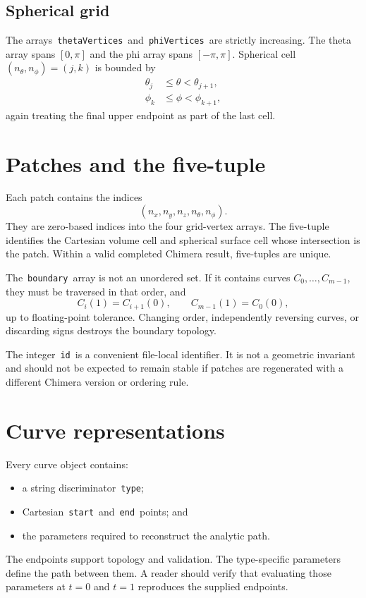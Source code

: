 \documentclass[11pt]{article}
\newcommand{\field}[1]{\texttt{#1}}
\begin{document}
\subsection{Spherical grid}

The arrays \,\field{thetaVertices}\, and \,\field{phiVertices}\, are strictly
increasing.  The theta array spans $[0,\pi]$ and the phi array spans
$[-\pi,\pi]$.  Spherical cell $(n_\theta,n_\phi)=(j,k)$ is bounded by
\begin{align}
  \theta_j &\le \theta < \theta_{j+1},\\
  \phi_k &\le \phi < \phi_{k+1},
\end{align}
again treating the final upper endpoint as part of the last cell.

\section{Patches and the five-tuple}

Each patch contains the indices
\[
  (n_x,n_y,n_z,n_\theta,n_\phi).
\]
They are zero-based indices into the four grid-vertex arrays.  The five-tuple
identifies the Cartesian volume cell and spherical surface cell whose
intersection is the patch.  Within a valid completed Chimera result, five-tuples
are unique.

The \,\field{boundary}\, array is not an unordered set.  If it contains curves
$C_0,\ldots,C_{m-1}$, they must be traversed in that order, and
\[
  C_i(1)=C_{i+1}(0),\qquad
  C_{m-1}(1)=C_0(0),
\]
up to floating-point tolerance.  Changing order, independently reversing
curves, or discarding signs destroys the boundary topology.

The integer \,\field{id}\, is a convenient file-local identifier.  It is not a
geometric invariant and should not be expected to remain stable if patches are
regenerated with a different Chimera version or ordering rule.

\section{Curve representations}

Every curve object contains:
\begin{itemize}[nosep]
  \item a string discriminator \,\field{type};
  \item Cartesian \,\field{start}\, and \,\field{end}\, points; and
  \item the parameters required to reconstruct the analytic path.
\end{itemize}
The endpoints support topology and validation.  The type-specific parameters
define the path between them.  A reader should verify that evaluating those
parameters at $t=0$ and $t=1$ reproduces the supplied endpoints.
\end{document}
